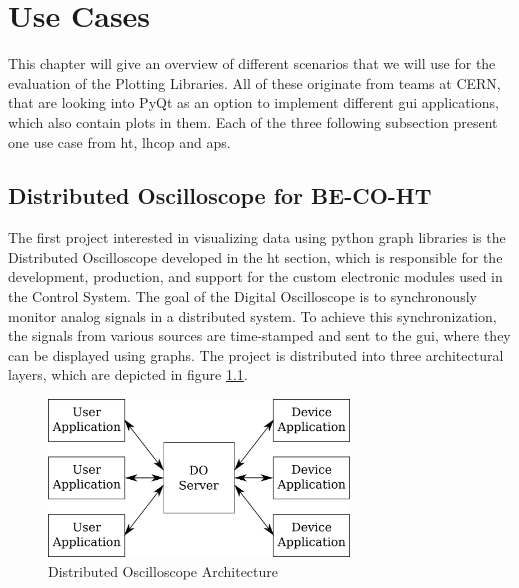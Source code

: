 
\chapter{Use Cases}
\label{ch:usecases}

This chapter will give an overview of different scenarios that we will use for
the evaluation of the Plotting Libraries. All of these originate from teams at
CERN, that are looking into PyQt as an option to implement different \gls{gui}
applications, which also contain plots in them. Each of the three following
subsection present one use case from \gls{ht}, \gls{lhcop} and \gls{aps}.


\section{Distributed Oscilloscope for BE-CO-HT}
\label{sec:usecases:becoht}

The first project interested in visualizing data using python graph libraries is
the Distributed Oscilloscope developed in the \gls{ht} section, which is
responsible for the development, production, and support for the custom
electronic modules used in the Control System. The goal of the Digital
Oscilloscope is to synchronously monitor analog signals in a distributed system.
To achieve this synchronization, the signals from various sources are
time-stamped and sent to the \gls{gui}, where they can be displayed using
graphs. The project is distributed into three architectural layers, which are
depicted in figure \ref{fig:doarchitecture}.

\begin{figure}[h]
    \centering
    \includegraphics[width=8cm]{resources/img/DoArchitecture}
    \caption{Distributed Oscilloscope Architecture}
    \label{fig:doarchitecture}
\end{figure}

